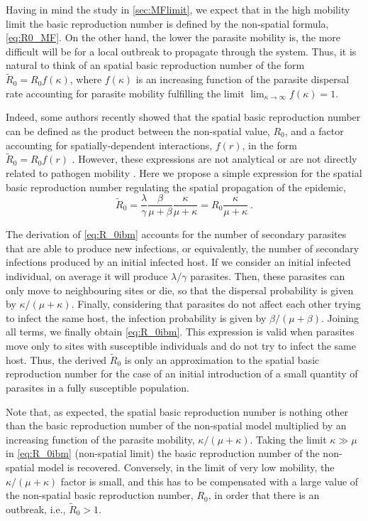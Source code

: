 Having in mind the study in \cref{sec:MFlimit}, we expect that in the high
mobility limit the basic reproduction number is defined by the non-spatial
formula, \cref{eq:R0_MF}. On the other hand, the lower the parasite mobility
is, the more difficult will be for a local outbreak to propagate through the
system. Thus, it is natural to think of an spatial basic reproduction number of
the form $\tilde{R}_0=R_0 f(\kappa)$, where $f(\kappa)$ is an increasing
function of the parasite dispersal rate accounting for parasite mobility
fulfilling the limit $\lim_{\kappa\to\infty}f(\kappa)=1$.

Indeed, some authors recently showed that the spatial basic reproduction
number can be defined as the product between the non-spatial value, $R_0$, and
a factor accounting for spatially-dependent interactions, $f(r)$, in the form
$\tilde{R}_0=R_0f(r)$ \cite{Filipe2003, Gilligan2021}. However, these
expressions are not analytical \cite{Filipe2003,Filipe2004} or are not directly
related to pathogen mobility \cite{Gilligan2021}. Here we propose a simple
expression for the spatial basic reproduction number regulating the spatial
propagation of the epidemic,
\begin{equation}\label{eq:R_0ibm}
    \tilde{R}_0=\frac{\lambda}{\gamma}\frac{\beta}{\mu+\beta}
    \frac{\kappa}{\mu+\kappa}=R_0\frac{\kappa}{\mu+\kappa}
    \ .
\end{equation}

The derivation of \cref{eq:R_0ibm} accounts for the number of secondary
parasites that are able to produce new infections, or equivalently, the number
of secondary infections produced by an initial infected host. If we consider an
initial infected individual, on average it will produce $\lambda/\gamma$
parasites. Then, these parasites can only move to neighbouring sites or die, so
that the dispersal probability is given by $\kappa/(\mu+\kappa)$. Finally,
considering that parasites do not affect each other trying to infect the same
host, the infection probability is given by $\beta/(\mu+\beta)$. Joining all
terms, we finally obtain \cref{eq:R_0ibm}. This expression is valid when
parasites move only to sites with susceptible individuals and do not try to
infect the same host. Thus, the derived $\tilde{R}_0$ is only an approximation
to the spatial basic reproduction number for the case of an initial
introduction of a small quantity of parasites in a fully susceptible
population.

Note that, as expected, the spatial basic reproduction number is nothing
other than the basic reproduction number of the non-spatial model multiplied by
an increasing function of the parasite mobility, $\kappa/(\mu+\kappa).$ Taking
the limit $\kappa\gg\mu$ in \cref{eq:R_0ibm} (non-spatial limit) the basic
reproduction number of the non-spatial model is recovered. Conversely, in the
limit of very low mobility, the $\kappa/(\mu+\kappa)$ factor is small, and this
has to be compensated with a large value of the non-spatial basic reproduction
number, $R_0$, in order that there is an outbreak, i.e., $\tilde{R}_0>1$.

